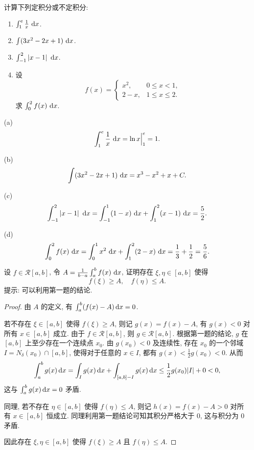\documentclass{article}
\begin{document}
\begin{problem}
计算下列定积分或不定积分:
\begin{enumerate}[label=(\alph*)]
	\item $\int_1^e \frac{1}{x}\,\,\mathrm{d} x$.
	\item $\int (3x^2 - 2x + 1)\,\,\mathrm{d} x$.
	\item $\int_{-1}^2 \left|x - 1\right|\,\,\mathrm{d} x$.
	\item 设
	\[
	f(x) =
	\begin{cases}
		x^2, & 0 \le x < 1, \\
		2 - x, & 1 \le x \le 2.
	\end{cases}
	\]
	求 $\int_0^2 f(x)\,\,\mathrm{d} x$.
\end{enumerate}
\end{problem}

\begin{solution}
  (a) \[ \int_1^e \frac{1}{x}\,\,\mathrm{d} x = \ln x \Big|_1^e = 1. \]

  (b) \[ \int (3x^2 - 2x + 1)\,\,\mathrm{d} x = x^3 - x^2 + x + C. \]

  (c) \[ \int_{-1}^2 \left|x - 1\right|\,\,\mathrm{d} x = \int_{-1}^1 (1-x)\,\,\mathrm{d} x + \int_1^2 (x-1)\,\,\mathrm{d} x = \frac{5}{2}. \]

  (d) \[ \int_0^2 f(x)\,\,\mathrm{d} x = \int_0^1 x^2\,\,\mathrm{d} x + \int_1^2 (2-x)\,\,\mathrm{d} x = \frac{1}{3} + \frac{1}{2} = \frac{5}{6}. \]
\end{solution}



\begin{problem}
设 $f \in \mathcal{R}[a,b]$, 令 $A = \frac{1}{b-a}\int_a^b f(x)\,\,\mathrm{d} x$, 证明存在 $\xi, \eta \in [a,b]$ 使得
\[
f(\xi) \ge A, \quad f(\eta) \le A.
\]
提示: 可以利用第一题的结论.
\end{problem}

\begin{proof}
  由 \( A \) 的定义, 有 \( \int_{a}^{b}(f(x)-A)\,\mathrm{d} x=0 \). 
  
  若不存在 \( \xi\in[a,b] \) 使得 \( f(\xi)\ge A \), 则记 \( g(x) = f(x)-A \), 有 \( g(x)<0 \) 对所有 \( x\in[a,b] \) 成立. 由于 \( f \in \mathcal{R}[a,b] \), 则 \( g \in \mathcal{R}[a,b] \). 根据第一题的结论, \( g \) 在 \( [a,b] \) 上至少存在一个连续点 \( x_0 \). 由 \( g(x_0)<0 \) 及连续性, 存在 \( x_0 \) 的一个邻域 \( I = N_\delta(x_0)\cap[a,b] \), 使得对于任意的 \( x\in I \), 都有 \( g(x) < \frac{1}{2}g(x_0) < 0 \). 从而
  \[ \int_{a}^{b}g(x)\,\mathrm{d} x = \int_I g(x)\,\mathrm{d} x + \int_{[a,b]-I} g(x)\,\mathrm{d} x \le \frac{1}{2}g(x_0)|I| + 0 < 0, \]
  这与 \( \int_{a}^{b}g(x)\,\mathrm{d} x=0 \) 矛盾. 

  同理, 若不存在 \( \eta\in[a,b] \) 使得 \( f(\eta)\le A \), 则记 \( h(x)=f(x)-A>0 \) 对所有 \( x \in [a,b] \) 恒成立. 同理利用第一题结论可知其积分严格大于 \( 0 \), 这与积分为 \( 0 \) 矛盾.

  因此存在 \( \xi, \eta\in[a,b] \) 使得 \( f(\xi)\ge A \) 且 \( f(\eta)\le A \).
\end{proof}
\end{document}
